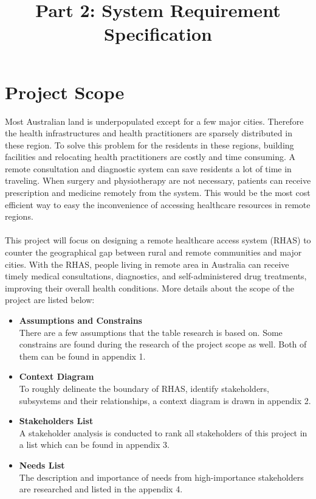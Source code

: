 \documentclass{article}
\date{}
\begin{document}
\title{\vspace{-1cm}Part 2: System Requirement Specification}
\maketitle
\section{Project Scope}
Most Australian land is underpopulated except for a few major cities. Therefore the health infrastructures and health practitioners are sparsely distributed in these region. To solve this problem for the residents in these regions, building facilities and relocating health practitioners are costly and time consuming. A remote consultation and diagnostic system can save residents a lot of time in traveling. When surgery and physiotherapy are not necessary, patients can receive prescription and medicine remotely from the system. This would be the most cost efficient way to easy the inconvenience of accessing healthcare resources in remote regions.\\\\
This project will focus on designing a remote healthcare access system (RHAS) to counter the geographical gap between rural and remote communities and major cities. With the RHAS, people living in remote area in Australia can receive timely medical consultations, diagnostics, and self-administered drug treatments, improving their overall health conditions. More details about the scope of the project are listed below:
\begin{itemize}
\item \textbf{Assumptions and Constrains}\\
There are a few assumptions that the table research is based on. Some constrains are found during the research of the project scope as well. Both of them can be found in appendix 1.
\item \textbf{Context Diagram}\\
To roughly delineate the boundary of RHAS, identify stakeholders, subsystems and their relationships, a context diagram is drawn in appendix 2.
\item \textbf{Stakeholders List}\\
A stakeholder analysis is conducted to rank all stakeholders of this project in a list which can be found in appendix 3.
\item \textbf{Needs List}\\
The description and importance of needs from high-importance stakeholders are researched and listed in the appendix 4.
\end{itemize}
\end{document}
